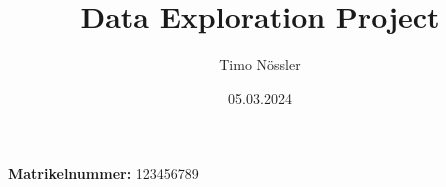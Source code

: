 \documentclass{article}
\title{\Huge Data Exploration Project}
\author{Timo Nössler}
\date{\vspace{2cm}05.03.2024}
\begin{document}
\clearpage\maketitle
\thispagestyle{empty}
\begin{center}
\textbf{Matrikelnummer:} 123456789
\end{center}
\end{document}
